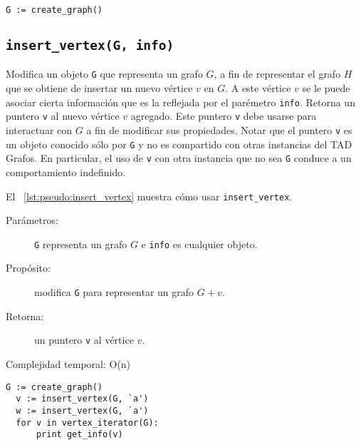 \documentclass[%
    a4paper,%
    12pt,%
    twoside,%
    openright,%
    halfparskip,%
    cleardoubleempty,%
    bigheadings,%
    titlepage,%
    headsepline%
]{scrbook}
\makeatletter
\newcommand{\Code}[1]{\lstinline[basicstyle={\tt}]@#1@}
\makeatother
\begin{document}
\begin{lstlisting}[caption={Ejemplo de uso de \Code{create\_graph}},gobble=2,float=ht,label={lst:pseudo:create_graph},emph={create_graph}]
  G := create_graph()
\end{lstlisting}

\subsection{\texttt{insert\_vertex(G, info)}}
\label{sec:tad grafo:insert-vertex}

Modifica un objeto \Code{G} que representa un grafo $G$, a fin de representar el grafo $H$ que se obtiene de insertar un nuevo vértice $v$ en $G$.  A este vértice $v$ se le puede asociar cierta información que es la reflejada por el parémetro \Code{info}.  Retorna un puntero \Code{v} al nuevo vértice $v$ agregado.  Este puntero \Code{v} debe usarse para interactuar con $G$ a fin de modificar sus propiedades.  Notar que el puntero \Code{v} es un objeto conocido sólo por \Code{G} y no es compartido con otras instancias del TAD Grafos.  En particular, el uso de \Code{v} con otra instancia que no sea \Code{G} conduce a un comportamiento indefinido.  

El \lstlistingname~\ref{lst:pseudo:insert_vertex} muestra cómo usar \texttt{insert\_vertex}.
  
\begin{description}
  \item [Parámetros:] \Code{G} representa un grafo $G$ e \Code{info} es cualquier objeto.
  \item [Propósito:] modifica \Code{G} para representar un grafo $G + v$.
  \item [Retorna:] un puntero \Code{v} al vértice $v$.
  \item [Complejidad temporal: O(n)]
\end{description}


\begin{lstlisting}[caption={Ejemplo de uso de insert\_vertex.  Crea un grafo $G$ con dos vértices, ambos con la letra ``a'' como información.  Luego, el ciclo imprime ``aa''. Ver Sección~\ref{sec:tad grafo:vertex-iterator} para más información de \texttt{vertex\_iterator}.},gobble=2,float=ht,label={lst:pseudo:insert_vertex},emph={insert_vertex}]
  G := create_graph()
  v := insert_vertex(G, `a')
  w := insert_vertex(G, `a')
  for v in vertex_iterator(G):
      print get_info(v)
\end{lstlisting}
\end{document}
